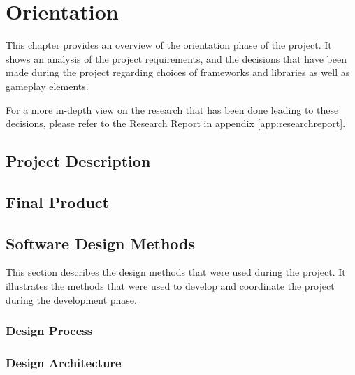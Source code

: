 \chapter{Orientation} \label{cha:orientation}

  This chapter provides an overview of the orientation phase of the project.
  It shows an analysis of the project requirements, and the decisions that
  have been made during the project regarding choices of frameworks and
  libraries as well as gameplay elements.

  For a more in-depth view on the research that has been done leading to
  these decisions, please refer to the Research Report in appendix
  \ref{app:researchreport}.

  \section{Project Description} \label{sec:projectdescription}

  \section{Final Product} \label{sec:finalproduct}

  \section{Software Design Methods} \label{sec:designmethods}
    This section describes the design methods that were used during the
    project. It illustrates the methods that were used to develop and
    coordinate the project during the development phase.

    \subsection{Design Process} \label{ssec:designprocess}

    \subsection{Design Architecture} \label{ssec:designarchitecture}

    \subsection{} \label{sec:}
